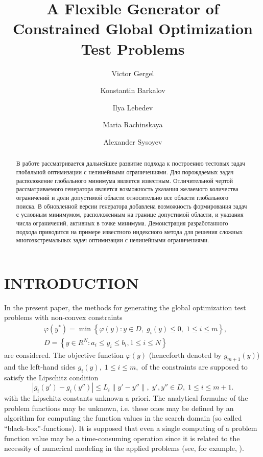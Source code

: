 \documentclass{aip-cp}
\begin{document}

\title{A Flexible  Generator of Constrained Global Optimization Test Problems}


\author{Victor Gergel}
\author{Konstantin Barkalov}
\author{Ilya Lebedev}
\author{Maria Rachinskaya}
\author{Alexander Sysoyev}



\maketitle

\begin{abstract}
\Russian
В работе рассматривается дальнейшее развитие подхода к построению тестовых задач глобальной оптимизации с нелинейными ограничениями. Для порождаемых задач расположение глобального минимума является известным.
Отличительной чертой рассматриваемого генератора является возможность указания желаемого количества ограничений и доли допустимой области относительно все области глобального поиска. В обновленной версии генератора добавлена возможность формирования задач с условным минимумом, расположенным на границе допустимой области, и указания числа ограничений, активных в точке минимума. Демонстрация разработанного подхода приводится на примере известного индексного метода для решения сложных многоэкстремальных задач оптимизации с нелинейными ограничениями.
\end{abstract}

\section{INTRODUCTION}

In the present paper, the methods for generating the global optimization test problems with non-convex constraints
\begin{eqnarray}
&\varphi(y^\ast)=\min{\left\{\varphi(y):y\in D, \; g_i(y)\leq 0, \; 1 \leq i \leq m\right\}}, \label{i_problem} \\
&D=\left\{y\in R^N: a_i\leq y_i \leq b_i, 1\leq i \leq N\right\} \label{D}
\end{eqnarray}
are considered. The objective function $\varphi(y)$ (henceforth denoted by $g_{m+1}(y)$) and the left-hand sides $g_i(y), \; 1\leq i \leq m,$ of the constraints are supposed to satisfy the Lipschitz condition
\[ \left|g_i(y')-g_i (y'')\right| \leq L_i \left\|y'-y'' \right\|, \; y',y''\in D, \; 1\leq i \leq m+1. \]
with the Lipschitz constants unknown a priori. The analytical formulae of the problem functions may be unknown, i.e. these ones may be defined by an algorithm for computing the function values in the search domain (so called ``black-box''-functions). It is supposed that even a single computing of a problem function value may be a time-consuming operation since it is related to the necessity of numerical modeling in the applied problems (see, for example, \cite{Menniti2008,Kvasov2015,Modorskii2017}).
\end{document}

